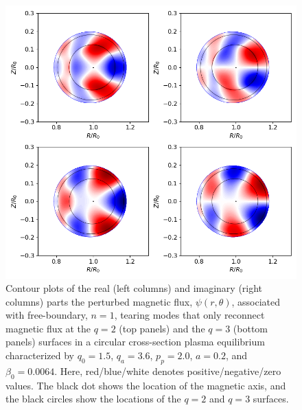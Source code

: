 \documentclass[12pt,prb,aps]{revtex4-1}
\begin{document}
\begin{figure}
\centerline{\includegraphics[width=\textwidth]{Fig9.png}}
\caption{Contour plots of the real (left columns) and imaginary (right columns) parts the perturbed magnetic flux, $\psi(r,\theta)$, associated with free-boundary, $n=1$, tearing modes that only reconnect magnetic flux at the $q=2$  (top panels) and the $q=3$ (bottom panels) surfaces in a 
circular cross-section plasma equilibrium characterized by $q_0=1.5$, $q_a= 3.6$, $p_p=2.0$,
$a=0.2$, and $\beta_0 =0.0064$. Here, red/blue/white denotes positive/negative/zero values. The black dot shows the location of the magnetic axis, and the
black circles show the locations of the $q=2$ and $q=3$ surfaces. \label{fig9}}
\end{figure}
\end{document}
